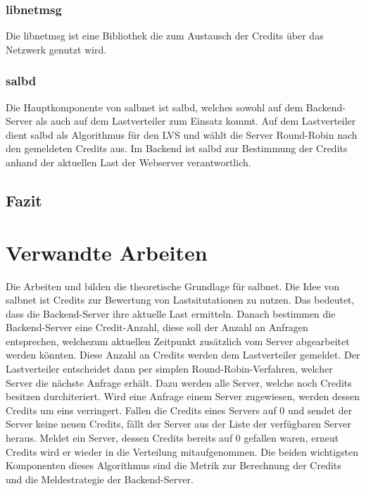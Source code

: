 \documentclass[a4paper, 12pt, BCOR10mm, DIV12, toc=bibliography, toc=listof, german]{scrbook}
\begin{document}

			\subsection*{libnetmsg} %

			Die libnetmsg ist eine Bibliothek die zum Austausch der Credits über das Netzwerk genutzt
			wird. 
			
			
			\subsection*{salbd} %

			Die Hauptkomponente von salbnet ist salbd, welches sowohl auf dem Backend-Server als auch auf
			dem Lastverteiler zum Einsatz kommt. Auf dem Lastverteiler dient salbd als Algorithmus für
			den LVS und wählt die Server Round-Robin nach den gemeldeten Credits aus. Im Backend ist salbd
			zur Bestimmung der Credits anhand der aktuellen Last der Webserver verantwortlich.
				


		\section{Fazit} %
		\label{sec:grundlagen-fazit}
		


	\chapter{Verwandte Arbeiten} %
	\label{cha:arbeiten}

	Die Arbeiten \cite{scsczile2008} und \cite{schneidenbach2009} bilden die theoretische Grundlage
	für salbnet. Die Idee von salbnet ist Credits zur Bewertung von Lastsitutationen zu nutzen. Das
	bedeutet, dass die Backend-Server ihre aktuelle Last ermitteln. Danach bestimmen die
	Backend-Server eine Credit-Anzahl, diese soll der Anzahl an Anfragen entsprechen, welchezum
	aktuellen Zeitpunkt zusätzlich vom Server abgearbeitet werden könnten. Diese Anzahl an Credits
	werden dem Lastverteiler gemeldet. Der Lastverteiler entscheidet dann per simplen
	Round-Robin-Verfahren, welcher Server die nächste Anfrage erhält.  Dazu werden alle Server, welche
	noch Credits besitzen durchiteriert. Wird eine Anfrage einem Server zugewiesen, werden dessen
	Credits um eins verringert. Fallen die Credits eines Servers auf 0 und sendet der Server keine
	neuen Credits, fällt der Server aus der Liste der verfügbaren Server heraus. Meldet ein Server,
	dessen Credits bereits auf 0 gefallen waren, erneut Credits wird er wieder in die Verteilung
	mitaufgenommen. Die beiden wichtigsten Komponenten dieses Algorithmus sind die Metrik zur
	Berechnung der Credits und die Meldestrategie der Backend-Server.
\end{document}
